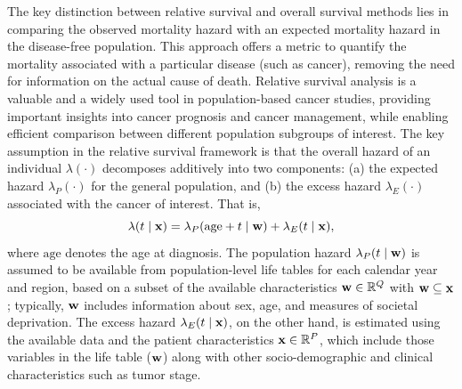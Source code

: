 \documentclass[12pt]{article}
\newcommand{\bfx}{{\bf x}}
\newcommand{\bfw}{{\bf w}}
\begin{document}
The key distinction between relative survival and overall survival methods lies in comparing the observed mortality hazard with an expected mortality hazard in the disease-free population. This approach offers a metric to quantify the mortality associated with a particular disease (such as cancer), removing the need for information on the actual cause of death. Relative survival analysis is a valuable and a widely used tool in population-based cancer studies, providing important insights into cancer prognosis and cancer management, while enabling efficient comparison between different population subgroups of interest. The key assumption in the relative survival framework is that the overall hazard of an individual $\lambda(\cdot)$ decomposes additively into two components: (a) the expected hazard $\lambda_P(\cdot)$ for the general population, and (b) the excess hazard $\lambda_E(\cdot)$ associated with the cancer of interest. That is, 
\begin{equation}
  \lambda(t \mid \bfx) = \lambda_P(\text{age} + t \mid \bfw) + \lambda_E(t \mid \bfx),
  \label{eq:exh_additive_decomp}
\end{equation}
where $\text{age}$ denotes the age at diagnosis. The population hazard $\lambda_P(t \mid \bfw)$ is assumed to be available from population-level life tables for each calendar year and region, based on a subset of the available characteristics $\bfw \in {\mathbb R}^Q$ with $\bfw \subseteq \bfx$; typically, $\bfw$ includes information about sex, age, and measures of societal deprivation. The excess hazard $\lambda_E(t \mid \bfx)$, on the other hand, is estimated using the available data and the patient characteristics $\bfx\in {\mathbb R}^P$, which include those variables in the life table ($\bfw$) along with other socio-demographic and clinical characteristics such as tumor stage. 
 
% 

 
 
 
\end{document}
